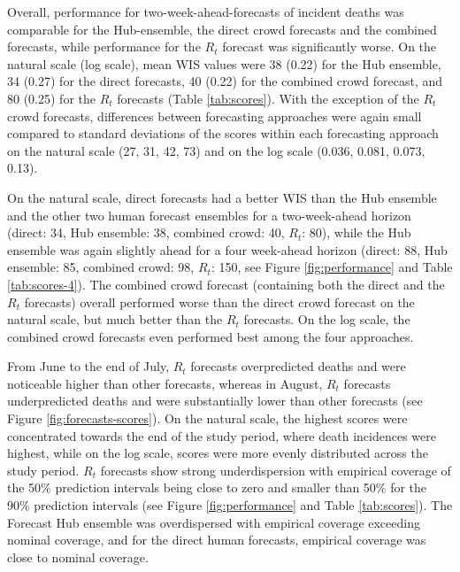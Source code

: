 \documentclass[10pt,a4paper,twocolumn]{article}
\begin{document}
Overall, performance for two-week-ahead-forecasts of incident deaths was comparable for the Hub-ensemble, the direct crowd forecasts and the combined forecasts, while performance for the $R_t$ forecast was significantly worse. On the natural scale (log scale), mean WIS values were 38 (0.22) for the Hub ensemble, 34 (0.27) for the direct forecasts, 40 (0.22) for the combined crowd forecast, and 80 (0.25) for the $R_t$ forecasts (Table \ref{tab:scores}). 
With the exception of the $R_t$ crowd forecasts, differences between forecasting approaches were again small compared to 
standard deviations of
the scores within each forecasting approach on the natural scale (27, 31, 42, 73) and on the log scale (0.036, 0.081, 0.073, 0.13). 

On the natural scale, direct forecasts had a better WIS than the Hub ensemble and the other two human forecast ensembles for a two-week-ahead horizon (direct: 34, Hub ensemble: 38, combined crowd: 40, $R_t$: 80), while the Hub ensemble was again slightly ahead for a four week-ahead horizon (direct: 88, Hub ensemble: 85, combined crowd: 98, $R_t$: 150, see Figure \ref{fig:performance} and Table \ref{tab:scores-4}). The combined crowd forecast (containing both the direct and the $R_t$ forecasts) overall performed worse than the direct crowd forecast on the natural scale, but much better than the $R_t$ forecasts. On the log scale, the combined crowd forecasts even performed best among the four approaches. 

From June to the end of July, $R_t$ forecasts overpredicted deaths and were noticeable higher than other forecasts, whereas in August, $R_t$ forecasts underpredicted deaths and were substantially lower than other forecasts (see Figure \ref{fig:forecasts-scores}). On the natural scale, the highest scores were concentrated towards the end of the study period, where death incidences were highest, while on the log scale, scores were more evenly distributed across the study period. $R_t$ forecasts show strong underdispersion with empirical coverage of the 50\% prediction intervals being close to zero and smaller than 50\% for the 90\% prediction intervals (see Figure \ref{fig:performance} and Table \ref{tab:scores}). The Forecast Hub ensemble was overdispersed with empirical coverage exceeding nominal coverage, and for the direct human forecasts, empirical coverage was close to nominal coverage. 
\end{document}
